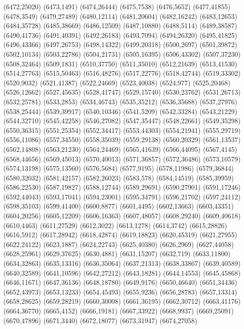 (6472,25020)
(6473,1491)
(6474,26444)
(6475,7538)
(6476,5652)
(6477,41855)
(6478,3549)
(6479,27489)
(6480,12114)
(6481,20604)
(6482,16242)
(6483,12653)
(6484,35728)
(6485,38669)
(6486,12509)
(6487,10880)
(6488,5114)
(6489,38587)
(6490,41736)
(6491,40391)
(6492,26183)
(6493,7094)
(6494,26320)
(6495,41825)
(6496,43366)
(6497,26753)
(6498,14322)
(6499,20318)
(6500,2697)
(6501,39872)
(6502,10134)
(6503,22786)
(6504,21731)
(6505,16395)
(6506,43302)
(6507,37230)
(6508,32464)
(6509,1831)
(6510,37750)
(6511,35010)
(6512,21639)
(6513,41530)
(6514,27763)
(6515,50463)
(6516,48276)
(6517,22776)
(6518,42744)
(6519,33302)
(6520,9032)
(6521,41387)
(6522,24669)
(6523,40038)
(6524,977)
(6525,20468)
(6526,12662)
(6527,45635)
(6528,41747)
(6529,15740)
(6530,23762)
(6531,26713)
(6532,25781)
(6533,2853)
(6534,46743)
(6535,35212)
(6536,35688)
(6537,27976)
(6538,25444)
(6539,39917)
(6540,10346)
(6541,5209)
(6542,33284)
(6543,21229)
(6544,32710)
(6545,42258)
(6546,27082)
(6547,35447)
(6548,22661)
(6549,35298)
(6550,36315)
(6551,25354)
(6552,34417)
(6553,44303)
(6554,21941)
(6555,29719)
(6556,11086)
(6557,34550)
(6558,35039)
(6559,29138)
(6560,20329)
(6561,13537)
(6562,14808)
(6563,21230)
(6564,24469)
(6565,41639)
(6566,44095)
(6567,4145)
(6568,44656)
(6569,45013)
(6570,40013)
(6571,36857)
(6572,36486)
(6573,10579)
(6574,13198)
(6575,13560)
(6576,5684)
(6577,9195)
(6578,11986)
(6579,36844)
(6580,32032)
(6581,42157)
(6582,26023)
(6583,578)
(6584,14519)
(6585,39959)
(6586,22530)
(6587,19827)
(6588,12744)
(6589,29691)
(6590,27901)
(6591,17246)
(6592,44043)
(6593,17041)
(6594,23001)
(6595,34791)
(6596,21702)
(6597,24112)
(6598,35103)
(6599,41400)
(6600,8877)
(6601,4495)
(6602,13663)
(6603,43351)
(6604,20256)
(6605,12209)
(6606,16363)
(6607,48057)
(6608,29240)
(6609,40618)
(6610,4463)
(6611,27529)
(6612,3022)
(6613,1278)
(6614,3742)
(6615,28826)
(6616,5912)
(6617,28942)
(6618,42874)
(6619,18823)
(6620,45319)
(6621,27955)
(6622,24122)
(6623,1887)
(6624,22743)
(6625,40380)
(6626,2969)
(6627,44058)
(6628,25961)
(6629,37625)
(6630,4881)
(6631,15207)
(6632,719)
(6633,11800)
(6634,32863)
(6635,13316)
(6636,35064)
(6637,21313)
(6638,33867)
(6639,40589)
(6640,32589)
(6641,10596)
(6642,27212)
(6643,18281)
(6644,14553)
(6645,45868)
(6646,11671)
(6647,36136)
(6648,18780)
(6649,9176)
(6650,46640)
(6651,34436)
(6652,43973)
(6653,13233)
(6654,45493)
(6655,9236)
(6656,28783)
(6657,13314)
(6658,28625)
(6659,28219)
(6660,30008)
(6661,36195)
(6662,30712)
(6663,41176)
(6664,36770)
(6665,4152)
(6666,19181)
(6667,33922)
(6668,9937)
(6669,25091)
(6670,47896)
(6671,3440)
(6672,18077)
(6673,31947)
(6674,27058)
